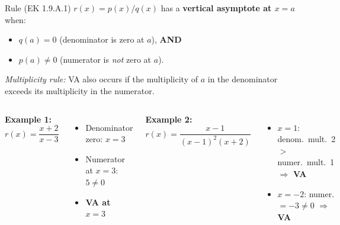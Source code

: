 \documentclass[aspectratio=169, 11pt]{beamer}
\begin{document}
\begin{frame}[t, plain]

  \begin{block}{Rule (EK 1.9.A.1)}
    $r(x) = p(x)/q(x)$ has a \textbf{vertical asymptote at $x = a$} when:
    \begin{itemize}\setlength{\itemsep}{4pt}
      \item $q(a) = 0$ \quad (denominator is zero at $a$), \textbf{AND}
      \item $p(a) \ne 0$ \quad (numerator is \emph{not} zero at $a$).
    \end{itemize}
    \textit{Multiplicity rule:} VA also occurs if the multiplicity of $a$ in the denominator
    exceeds its multiplicity in the numerator.
  \end{block}

  \bigskip
  \begin{columns}[T]
      \textbf{Example 1:} $r(x) = \dfrac{x+2}{x-3}$
      \begin{itemize}\setlength{\itemsep}{5pt}
        \item Denominator zero: $x = 3$
        \item Numerator at $x=3$: $5 \ne 0$
        \item \textbf{VA at $x = 3$}
      \end{itemize}

      \textbf{Example 2:} $r(x) = \dfrac{x-1}{(x-1)^2(x+2)}$
      \begin{itemize}\setlength{\itemsep}{5pt}
        \item $x=1$: denom.\ mult.\ 2 $>$ numer.\ mult.\ 1 $\Rightarrow$ \textbf{VA}
        \item $x=-2$: numer.\ $= -3 \ne 0$ $\Rightarrow$ \textbf{VA}
      \end{itemize}
  \end{columns}
\end{frame}
\end{document}

